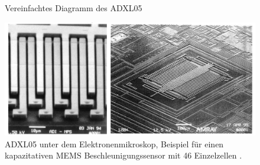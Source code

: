 \documentclass[12pt,a4paper]{scrartcl}
\begin{document}
\begin{figure}[htb]
	\centering
	\caption{Vereinfachtes Diagramm des ADXL05 \citep{Devices:1996pd}}
	\label{adxl}
\end{figure}

\begin{figure}[htb]
\centering
\includegraphics[scale=1]{adxl_micro.png}
\caption{ADXL05 unter dem Elektronenmikroskop, Beispiel für einen kapazitativen MEMS Beschleunigungssensor mit 46 Einzelzellen \citep{Klingbeil:2006qy}.}
\label{adxl_micro}
\end{figure}
\end{document}
